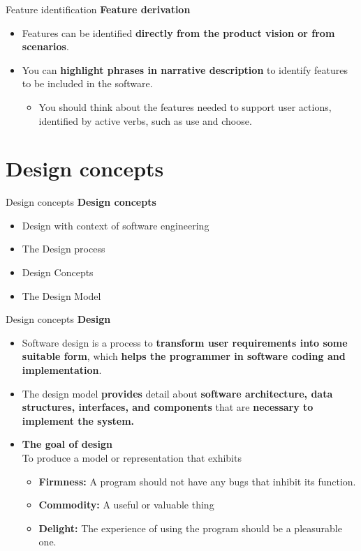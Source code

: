 \documentclass{beamer}
\begin{document}
\begin{frame}{Feature identification}
	\textbf{Feature derivation}
	\begin{itemize}
		\item Features can be identified \textbf{directly from the product vision or from scenarios}.
		\item You can\textbf{ highlight phrases in narrative description} to identify features to be included in the software.
		\begin{itemize}
			\item You should think about the features needed to support user actions, identified by active verbs, such as use and choose.
		\end{itemize}
	\end{itemize}
\end{frame}
\section{Design concepts}
\begin{frame}{Design concepts}
	\textbf{Design concepts}
	\begin{itemize}
		\item Design with context of software engineering
		\item The Design process
		\item Design Concepts
		\item The Design Model
	\end{itemize}
\end{frame}
\begin{frame}{Design concepts}
	\textbf{Design}
	\begin{itemize}
		\item Software design is a process to\textbf{ transform user requirements into some suitable form}, which\textbf{ helps the programmer in software coding and implementation}.
		\item The design    model \textbf{provides} detail about \textbf{software architecture, data structures, 
			interfaces, and components} that are \textbf{necessary to implement the 
			system.}
		\item \textbf{The goal of design}\\To produce a model or representation that exhibits
		\begin{itemize}
			\item \textbf{Firmness:} A program should not have any bugs that inhibit its function. 
			\item \textbf{Commodity:} A useful or valuable thing
			\item \textbf{Delight:} The experience of using the program should be a pleasurable one.
		\end{itemize}
	\end{itemize}
\end{frame}
\end{document}
